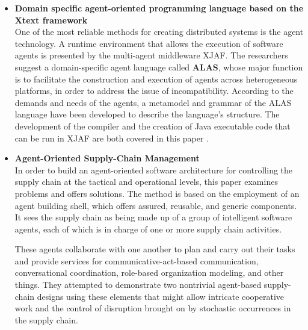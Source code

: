\begin{itemize}
\vspace{.5cm}

\item \textbf{Domain specific agent-oriented programming language based on the Xtext framework} \\

One of the most reliable methods for creating distributed systems is the agent technology. A runtime environment that allows the execution of software agents is presented by the multi-agent middleware XJAF. The researchers suggest a domain-specific agent language called \textbf{ALAS}, whose major function is to facilitate the construction and execution of agents across heterogeneous platforms, in order to address the issue of incompatibility. According to the demands and needs of the agents, a metamodel and grammar of the ALAS language have been developed to describe the language's structure. The development of the compiler and the creation of Java executable code that can be run in XJAF are both covered in this paper \cite{xtext}.

\vspace{.5cm}

\item \textbf{Agent-Oriented Supply-Chain Management} \\

In order to build an agent-oriented software architecture for controlling the supply chain at the tactical and operational levels, this paper \cite{agSupch} examines problems and offers solutions. The method is based on the employment of an agent building shell, which offers assured, reusable, and generic components. It sees the supply chain as being made up of a group of intelligent software agents, each of which is in charge of one or more supply chain activities. 

\vspace{.5cm}

These agents collaborate with one another to plan and carry out their tasks and provide services for communicative-act-based communication, conversational coordination, role-based organization modeling, and other things. They attempted to demonstrate two nontrivial agent-based supply-chain designs using these elements that might allow intricate cooperative work and the control of disruption brought on by stochastic occurrences in the supply chain.

\vspace{.5cm}


\end{itemize}
